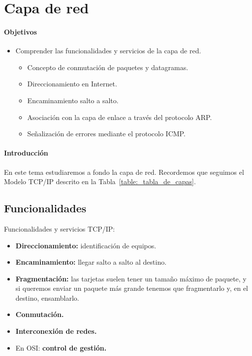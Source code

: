 \chapter{Capa de red}

\subsubsection{Objetivos}

\begin{itemize}
    \item Comprender las funcionalidades y servicios de la capa de red.
        \begin{itemize}
            \item Concepto de conmutación de paquetes y datagramas. 
            \item Direccionamiento en Internet.
            \item Encaminamiento salto a salto.
            \item Asociación con la capa de enlace a través del protocolo \acrshort{ARP}\@.
            \item Señalización de errores mediante el protocolo \acrshort{ICMP}\@.
        \end{itemize}
\end{itemize}

\subsubsection{Introducción}

En este tema estudiaremos a fondo la capa de red. Recordemos que seguimos el Modelo TCP/IP descrito en la Tabla~\ref{table:_tabla_de_capas}.

\section{Funcionalidades}

Funcionalidades y servicios TCP\@/IP\@:
\begin{itemize}
    \item \textbf{Direccionamiento:} identificación de equipos.
    \item \textbf{Encaminamiento:} llegar salto a salto al destino. 
    \item \textbf{Fragmentación:} las tarjetas suelen tener un tamaño máximo de paquete, y si queremos enviar un paquete más grande tenemos que fragmentarlo y, en el destino, ensamblarlo. 
    \item \textbf{Conmutación.} 
    \item \textbf{Interconexión de redes.}
    \item En OSI\@: \textbf{control de gestión.}
\end{itemize} 

